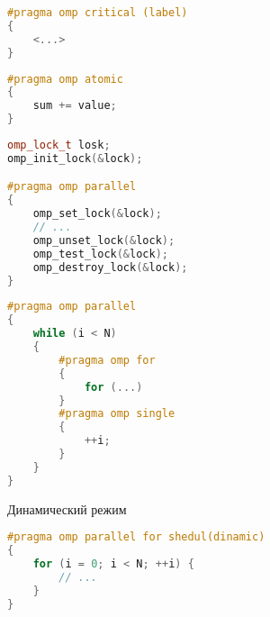 \begin{frame}[fragile]

\begin{lstlisting}[language=C++,basicstyle=\ttfamily,keywordstyle=\color{blue},basicstyle=\scriptsize]
#pragma omp critical (label)
{
    <...>
}
\end{lstlisting}

\end{frame}

\begin{frame}[fragile]

\begin{lstlisting}[language=C++,basicstyle=\ttfamily,keywordstyle=\color{blue},basicstyle=\scriptsize]
#pragma omp atomic
{
    sum += value;
}
\end{lstlisting}

\end{frame}

\begin{frame}[fragile]

\begin{lstlisting}[language=C++,basicstyle=\ttfamily,keywordstyle=\color{blue},basicstyle=\scriptsize]
omp_lock_t losk;
omp_init_lock(&lock);

#pragma omp parallel
{
    omp_set_lock(&lock);
    // ...
    omp_unset_lock(&lock);
    omp_test_lock(&lock);
    omp_destroy_lock(&lock);
}
\end{lstlisting}

\end{frame}

\begin{frame}[fragile]

\begin{lstlisting}[language=C++,basicstyle=\ttfamily,keywordstyle=\color{blue},basicstyle=\scriptsize]
#pragma omp parallel
{
    while (i < N)
    {
        #pragma omp for
        {
            for (...)
        }
        #pragma omp single
        {
            ++i;
        }
    }
}
\end{lstlisting}

\end{frame}

\begin{frame}[fragile]{Динамический режим}

\begin{lstlisting}[language=C++,basicstyle=\ttfamily,keywordstyle=\color{blue},basicstyle=\scriptsize]
#pragma omp parallel for shedul(dinamic)
{
    for (i = 0; i < N; ++i) {
        // ...
    }
}
\end{lstlisting}

\end{frame}

